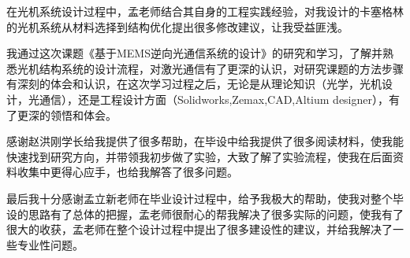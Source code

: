 在光机系统设计过程中，孟老师结合其自身的工程实践经验，对我设计的卡塞格林的光机系统从材料选择到结构优化提出很多修改建议，让我受益匪浅。

我通过这次课题《基于MEMS逆向光通信系统的设计》的研究和学习，了解并熟悉光机结构系统的设计流程，对激光通信有了更深的认识，对研究课题的方法步骤有深刻的体会和认识，在这次学习过程之后，无论是从理论知识（光学，光机设计，光通信），还是工程设计方面（Solidworks,Zemax,CAD,Altium designer），有了更深的领悟和体会。

感谢赵洪刚学长给我提供了很多帮助，在毕设中给我提供了很多阅读材料，使我能快速找到研究方向，并带领我初步做了实验，大致了解了实验流程，使我在后面资料收集中更得心应手，也给我解答了很多问题。

最后我十分感谢孟立新老师在毕业设计过程中，给予我极大的帮助，使我对整个毕设的思路有了总体的把握，孟老师很耐心的帮我解决了很多实际的问题，使我有了很大的收获，孟老师在整个设计过程中提出了很多建设性的建议，并给我解决了一些专业性问题。

